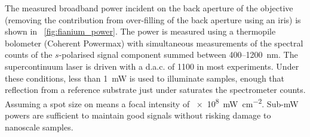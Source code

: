 \documentclass{article}
\begin{document}
The measured broadband power incident on the back aperture of the objective (removing the contribution from over-filling of the back aperture using an iris) is shown in \figurename~\ref{fig:fianium_power}. The power is measured using a thermopile bolometer (Coherent Powermax) with simultaneous measurements of the spectral counts of the $s$-polarised signal component summed between 400--\SI{1200}{nm}. The supercontinuum laser is driven with a d.a.c. of 1100 in most experiments. Under these conditions, less than \SI{1}{mW} is used to illuminate samples, enough that reflection from a reference substrate just under saturates the spectrometer counts. Assuming a spot size on  means a focal intensity of \SI{e8}{\milli\watt\per\centi\metre\squared}. Sub-mW powers are sufficient to maintain good signals without risking damage to nanoscale samples.



\end{document}
